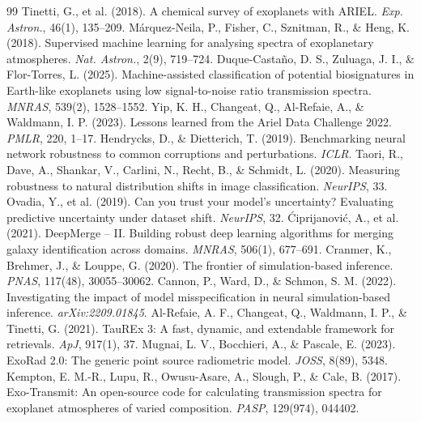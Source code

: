 \documentclass{article}
\begin{document}
\small
\begin{thebibliography}{99}
 Tinetti, G., et al. (2018). A chemical survey of exoplanets with ARIEL. \emph{Exp. Astron.}, 46(1), 135--209.
 Márquez-Neila, P., Fisher, C., Sznitman, R., \& Heng, K. (2018). Supervised machine learning for analysing spectra of exoplanetary atmospheres. \emph{Nat. Astron.}, 2(9), 719--724.
 Duque-Castaño, D. S., Zuluaga, J. I., \& Flor-Torres, L. (2025). Machine-assisted classification of potential biosignatures in Earth-like exoplanets using low signal-to-noise ratio transmission spectra. \emph{MNRAS}, 539(2), 1528--1552.
 Yip, K. H., Changeat, Q., Al-Refaie, A., \& Waldmann, I. P. (2023). Lessons learned from the Ariel Data Challenge 2022. \emph{PMLR}, 220, 1--17.
 Hendrycks, D., \& Dietterich, T. (2019). Benchmarking neural network robustness to common corruptions and perturbations. \emph{ICLR}.
 Taori, R., Dave, A., Shankar, V., Carlini, N., Recht, B., \& Schmidt, L. (2020). Measuring robustness to natural distribution shifts in image classification. \emph{NeurIPS}, 33.
 Ovadia, Y., et al. (2019). Can you trust your model's uncertainty? Evaluating predictive uncertainty under dataset shift. \emph{NeurIPS}, 32.
 \'{C}iprijanovi\'{c}, A., et al. (2021). DeepMerge -- II. Building robust deep learning algorithms for merging galaxy identification across domains. \emph{MNRAS}, 506(1), 677--691.
 Cranmer, K., Brehmer, J., \& Louppe, G. (2020). The frontier of simulation-based inference. \emph{PNAS}, 117(48), 30055--30062.
 Cannon, P., Ward, D., \& Schmon, S. M. (2022). Investigating the impact of model misspecification in neural simulation-based inference. \emph{arXiv:2209.01845}.
 Al-Refaie, A. F., Changeat, Q., Waldmann, I. P., \& Tinetti, G. (2021). TauREx 3: A fast, dynamic, and extendable framework for retrievals. \emph{ApJ}, 917(1), 37.
 Mugnai, L. V., Bocchieri, A., \& Pascale, E. (2023). ExoRad 2.0: The generic point source radiometric model. \emph{JOSS}, 8(89), 5348.
 Kempton, E. M.-R., Lupu, R., Owusu-Asare, A., Slough, P., \& Cale, B. (2017). Exo-Transmit: An open-source code for calculating transmission spectra for exoplanet atmospheres of varied composition. \emph{PASP}, 129(974), 044402.

\end{thebibliography}
\end{document}
